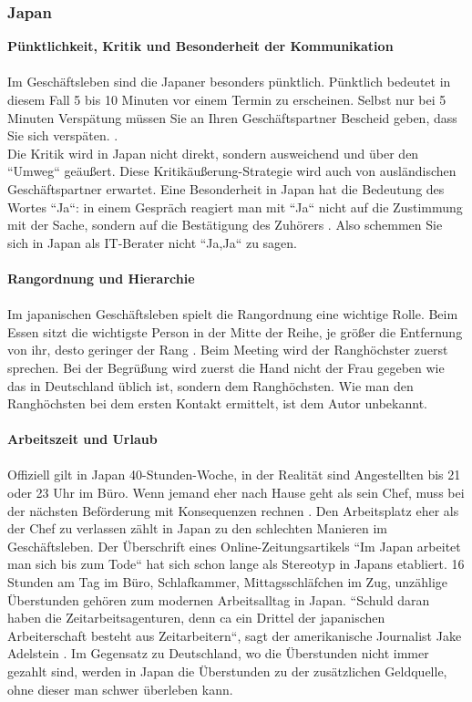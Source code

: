 	\subsubsection{Japan}
	\textbf{Pünktlichkeit, Kritik und Besonderheit der Kommunikation}\\
	\\
	Im Geschäftsleben sind die Japaner besonders pünktlich. Pünktlich bedeutet in diesem Fall 5 bis 10 Minuten vor einem Termin zu erscheinen. Selbst nur bei 5 Minuten Verspätung müssen Sie an Ihren Geschäftspartner Bescheid geben, dass Sie sich verspäten. \cite{KastensystemInd}. \\
	Die Kritik wird in Japan nicht direkt, sondern ausweichend und über den ``Umweg`` geäußert. Diese Kritikäußerung-Strategie wird auch von ausländischen Geschäftspartner erwartet. Eine Besonderheit in Japan hat die Bedeutung des Wortes ``Ja``: in einem Gespräch reagiert man mit ``Ja`` nicht auf die Zustimmung mit der Sache, sondern auf die Bestätigung des Zuhörers \cite{JPKnigge}. Also schemmen Sie sich in Japan als IT-Berater nicht  ``Ja,Ja`` zu sagen.\\
	\\
	\textbf{Rangordnung und Hierarchie}\\
	\\
	Im japanischen Geschäftsleben spielt die Rangordnung eine wichtige Rolle.
	Beim Essen sitzt die wichtigste Person in der Mitte der Reihe, je größer die Entfernung von ihr, desto geringer der Rang \cite{Business-KniggeFernost}.	
	Beim Meeting wird der Ranghöchster zuerst sprechen. Bei der Begrüßung wird zuerst die Hand nicht der Frau gegeben wie das in Deutschland üblich ist, sondern dem Ranghöchsten. Wie man den Ranghöchsten bei dem ersten Kontakt ermittelt, ist dem Autor unbekannt.\\
	\\
	\textbf{Arbeitszeit und Urlaub}\\
	\\
	Offiziell gilt in Japan 40-Stunden-Woche, in der Realität sind Angestellten bis 21 oder 23 Uhr im Büro. Wenn jemand eher nach Hause geht als sein Chef, muss bei der nächsten Beförderung mit Konsequenzen rechnen \cite{ArbZeitJP}. Den Arbeitsplatz eher als der Chef zu verlassen zählt in Japan zu den schlechten Manieren im Geschäftsleben.
	Der Überschrift eines Online-Zeitungsartikels ``Im Japan arbeitet man sich bis zum Tode`` hat sich schon lange als Stereotyp in Japans etabliert. 
	16 Stunden am Tag im Büro, Schlafkammer, Mittagsschläfchen im Zug, unzählige Überstunden gehören zum modernen Arbeitsalltag in Japan. ``Schuld daran haben die Zeitarbeitsagenturen, denn ca ein Drittel der japanischen Arbeiterschaft besteht aus Zeitarbeitern``, sagt der amerikanische Journalist Jake Adelstein \cite{JPArbeit}. Im Gegensatz zu Deutschland, wo die Überstunden nicht immer gezahlt sind, werden in Japan die Überstunden zu der zusätzlichen Geldquelle, ohne dieser man schwer überleben kann.
